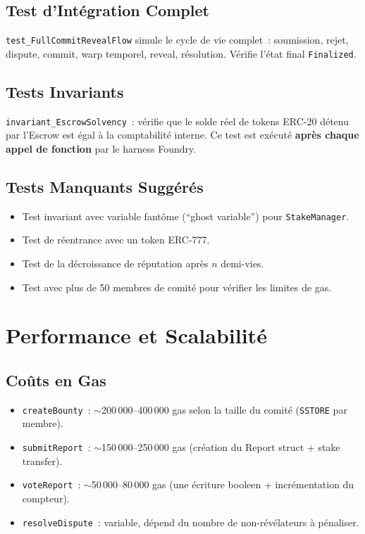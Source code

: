 \documentclass[12pt, a4paper]{report}
\begin{document}
\section{Test d'Int\'{e}gration Complet}
\texttt{test\_FullCommitRevealFlow} simule le cycle de vie complet~: soumission, rejet, dispute, commit, warp temporel, reveal, r\'{e}solution. V\'{e}rifie l'\'{e}tat final \texttt{Finalized}.

\section{Tests Invariants}
\texttt{invariant\_EscrowSolvency}~: v\'{e}rifie que le solde r\'{e}el de tokens ERC-20 d\'{e}tenu par l'Escrow est \'{e}gal \`{a} la comptabilit\'{e} interne. Ce test est ex\'{e}cut\'{e} \textbf{apr\`{e}s chaque appel de fonction} par le harness Foundry.

\section{Tests Manquants Sugg\'{e}r\'{e}s}
\begin{itemize}
    \item Test invariant avec variable fant\^{o}me (``ghost variable'') pour \texttt{StakeManager}.
    \item Test de r\'{e}entrance avec un token ERC-777.
    \item Test de la d\'{e}croissance de r\'{e}putation apr\`{e}s $n$ demi-vies.
    \item Test avec plus de 50 membres de comit\'{e} pour v\'{e}rifier les limites de gas.
\end{itemize}

\chapter{Performance et Scalabilit\'{e}}

\section{Co\^{u}ts en Gas}
\begin{itemize}
    \item \texttt{createBounty}~: $\sim$200\,000--400\,000 gas selon la taille du comit\'{e} (\texttt{SSTORE} par membre).
    \item \texttt{submitReport}~: $\sim$150\,000--250\,000 gas (cr\'{e}ation du Report struct + stake transfer).
    \item \texttt{voteReport}~: $\sim$50\,000--80\,000 gas (une \'{e}criture booleen + incr\'{e}mentation du compteur).
    \item \texttt{resolveDispute}~: variable, d\'{e}pend du nombre de non-r\'{e}v\'{e}lateurs \`{a} p\'{e}naliser.
\end{itemize}
\end{document}
